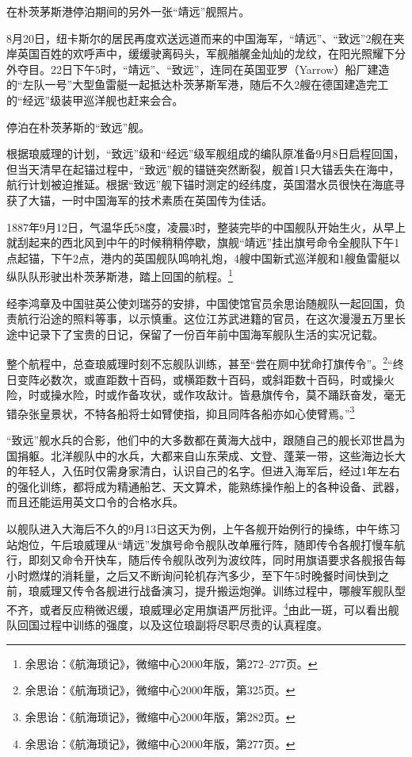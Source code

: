 \documentclass[12pt,UTF8]{ctexbook}
\begin{document}
在朴茨茅斯港停泊期间的另外一张“靖远”舰照片。

8月20日，纽卡斯尔的居民再度欢送远道而来的中国海军，“靖远”、“致远”2舰在夹岸英国百姓的欢呼声中，缓缓驶离码头，军舰艏艉金灿灿的龙纹，在阳光照耀下分外夺目。22日下午5时，“靖远”、“致远”，连同在英国亚罗（Yarrow）船厂建造的“左队一号”大型鱼雷艇一起抵达朴茨茅斯军港，随后不久2艘在德国建造完工的“经远”级装甲巡洋舰也赶来会合。

停泊在朴茨茅斯的“致远”舰。

根据琅威理的计划，“致远”级和“经远”级军舰组成的编队原准备9月8日启程回国，但当天清早在起锚过程中，“致远”舰的锚链突然断裂，舰首1只大锚丢失在海中，航行计划被迫推延。根据“致远”舰下锚时测定的经纬度，英国潜水员很快在海底寻获了大锚，一时中国海军的技术素质在英国传为佳话。

1887年9月12日，气温华氏58度，凌晨3时，整装完毕的中国舰队开始生火，从早上就刮起来的西北风到中午的时候稍稍停歇，旗舰“靖远”挂出旗号命令全舰队下午1点起锚，下午2点，港内的英国舰队鸣响礼炮，4艘中国新式巡洋舰和1艘鱼雷艇以纵队队形驶出朴茨茅斯港，踏上回国的航程。\footnote{余思诒：《航海琐记》，微缩中心2000年版，第272--277页。}

经李鸿章及中国驻英公使刘瑞芬的安排，中国使馆官员余思诒随舰队一起回国，负责航行沿途的照料等事，以示慎重。这位江苏武进籍的官员，在这次漫漫五万里长途中记录下了宝贵的日记，保留了一份百年前中国海军舰队生活的实况记载。

整个航程中，总查琅威理时刻不忘舰队训练，甚至“尝在厕中犹命打旗传令”。\footnote{余思诒：《航海琐记》，微缩中心2000年版，第325页。}“终日变阵必数次，或直距数十百码，或横距数十百码，或斜距数十百码，时或操火险，时或操水险，时或作备攻状，或作攻敌计。皆悬旗传令，莫不踊跃奋发，毫无错杂张皇景状，不特各船将士如臂使指，抑且同阵各船亦如心使臂焉。”\footnote{余思诒：《航海琐记》，微缩中心2000年版，第282页。}

“致远”舰水兵的合影，他们中的大多数都在黄海大战中，跟随自己的舰长邓世昌为国捐躯。北洋舰队中的水兵，大都来自山东荣成、文登、蓬莱一带，这些海边长大的年轻人，入伍时仅需身家清白，认识自己的名字。但进入海军后，经过1年左右的强化训练，都将成为精通船艺、天文算术，能熟练操作船上的各种设备、武器，而且还能运用英文口令的合格水兵。

以舰队进入大海后不久的9月13日这天为例，上午各舰开始例行的操练，中午练习站炮位，午后琅威理从“靖远”发旗号命令舰队改单雁行阵，随即传令各舰打慢车航行，即刻又命令开快车，随后传令舰队改列为波纹阵，同时用旗语要求各舰报告每小时燃煤的消耗量，之后又不断询问轮机存汽多少，至下午5时晚餐时间快到之前，琅威理又传令各舰进行战备演习，提升搬运炮弹。训练过程中，哪艘军舰队型不齐，或者反应稍微迟缓，琅威理必定用旗语严厉批评。\footnote{余思诒：《航海琐记》，微缩中心2000年版，第277页。}由此一斑，可以看出舰队回国过程中训练的强度，以及这位琅副将尽职尽责的认真程度。
\end{document}

